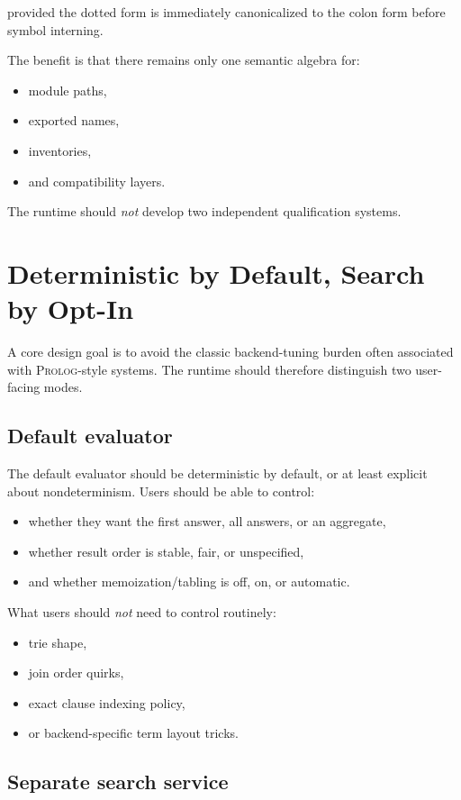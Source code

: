 \documentclass[11pt]{article}
\newcommand{\prolog}{\textsc{Prolog}}
\begin{document}
provided the dotted form is immediately canonicalized to the colon form before symbol interning.

The benefit is that there remains only one semantic algebra for:
\begin{itemize}[leftmargin=2em]
  \item module paths,
  \item exported names,
  \item inventories,
  \item and compatibility layers.
\end{itemize}

The runtime should \emph{not} develop two independent qualification systems.

\section{Deterministic by Default, Search by Opt-In}

A core design goal is to avoid the classic backend-tuning burden often associated with \prolog{}-style systems. The runtime should therefore distinguish two user-facing modes.

\subsection{Default evaluator}

The default evaluator should be deterministic by default, or at least explicit about nondeterminism. Users should be able to control:
\begin{itemize}[leftmargin=2em]
  \item whether they want the first answer, all answers, or an aggregate,
  \item whether result order is stable, fair, or unspecified,
  \item and whether memoization/tabling is off, on, or automatic.
\end{itemize}

What users should \emph{not} need to control routinely:
\begin{itemize}[leftmargin=2em]
  \item trie shape,
  \item join order quirks,
  \item exact clause indexing policy,
  \item or backend-specific term layout tricks.
\end{itemize}

\subsection{Separate search service}
\end{document}
